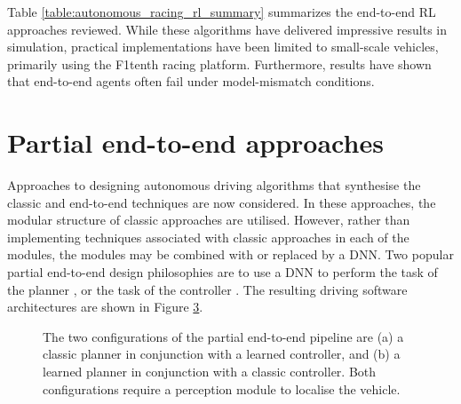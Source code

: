 Table \ref{table:autonomous_racing_rl_summary} summarizes the end-to-end RL approaches reviewed. 
While these algorithms have delivered impressive results in simulation, practical implementations have been limited to small-scale vehicles,
primarily using the F1tenth racing platform. 
Furthermore, results have shown that end-to-end agents often fail under model-mismatch conditions.




\section{Partial end-to-end approaches}
\label{sec:partial_end_to_end}

Approaches to designing autonomous driving algorithms that synthesise the classic and end-to-end techniques are now considered. 
In these approaches, the modular structure of classic approaches are utilised.
However, rather than implementing techniques associated with classic approaches in each of the modules, the modules may be combined with or replaced by a DNN.
Two popular partial end-to-end design philosophies are to use a DNN to perform the task of the planner \cite{Capo2020, Weiss2020, Weiss2020a, Mahmoud2020}, or the task of the controller \cite{Ghignone2022, Evans2021b}.
The resulting driving software architectures are shown in Figure \ref{fig:pete}.

\begin{figure}[htb!]
    \centering
    \begin{subfigure}[htb!]{\textwidth}
        \centering
        
        \caption[]{}
        \label{fig:pete_learned_control}
    \end{subfigure}
    \hfill
    \begin{subfigure}[htb!]{\textwidth}
        \centering
        
        \caption[]{}
        \label{fig:pete_learned_trajectory_planning}
    \end{subfigure}
\caption[Configurations of the partial end-to-end pipeline]{The two configurations of the partial end-to-end pipeline are (a) a classic planner in conjunction with a learned controller, and (b) a learned planner in conjunction with a classic controller. Both configurations require a perception module to localise the vehicle.}
\label{fig:pete}
\end{figure}



